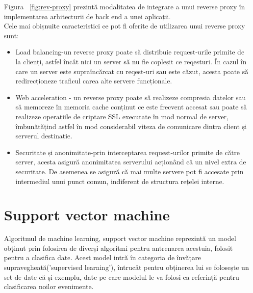 Figura ~\ref{fig:rev-proxy} prezintă modalitatea de integrare a unui reverse proxy în implementarea arhitecturii de back end a unei aplicații. \\

Cele mai obișnuite caracteristici ce pot fi oferite de utilizarea unui reverse proxy sunt: 
\begin{itemize}
	\item Load balancing-un reverse proxy poate să distribuie request-urile primite de la clienți, astfel încât nici un server să nu fie copleșit ce reqesturi. În cazul în care un server este supraîncărcat cu reqest-uri sau este căzut, acesta poate să redirecționeze traficul carea alte servere funcționale. 
	\item Web acceleration - un reverse proxy poate să realizeze compresia datelor sau să memoreze în memoria cache conținut ce este frecvent accesat sau poate să realizeze operațiile de criptare SSL executate în mod normal de server, îmbunătățind astfel în mod considerabil viteza de comunicare dintra client și serverul destinație. 
	\item  Securitate și anonimitate-prin interceptarea request-urilor primite de către server, acesta asigură anonimitatea serverului acționând că un nivel extra de securitate. De asemenea se asigură că mai multe servere pot fi accesate prin intermediul unui punct comun, indiferent de structura rețelei interne. 
\end{itemize}



\section{Support vector machine}

Algoritmul de machine learning, support vector machine reprezintă un model obținut prin folosirea de diverși algoritmi pentru antrenarea acestuia, folosit pentru a clasifica date. Acest model intră în categoria de învățare supravegheată('supervised learning'), întrucât pentru obținerea lui se folosește un set de date că și exemplu, date pe care modelul le va folosi ca referință pentru clasificarea noilor evenimente. 
  
